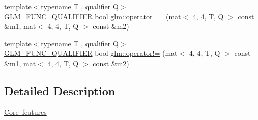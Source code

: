 \begin{DoxyCompactItemize}
\item 
{\footnotesize template$<$typename T , qualifier Q$>$ }\\\mbox{\hyperlink{setup_8hpp_a33fdea6f91c5f834105f7415e2a64407}{G\+L\+M\+\_\+\+F\+U\+N\+C\+\_\+\+Q\+U\+A\+L\+I\+F\+I\+ER}} bool \mbox{\hyperlink{namespaceglm_a8bcfe7feeeb780a7ea48046ae4c6cd57}{glm\+::operator==}} (mat$<$ 4, 4, T, Q $>$ const \&m1, mat$<$ 4, 4, T, Q $>$ const \&m2)
\item 
{\footnotesize template$<$typename T , qualifier Q$>$ }\\\mbox{\hyperlink{setup_8hpp_a33fdea6f91c5f834105f7415e2a64407}{G\+L\+M\+\_\+\+F\+U\+N\+C\+\_\+\+Q\+U\+A\+L\+I\+F\+I\+ER}} bool \mbox{\hyperlink{namespaceglm_ae03f4496a0725bb705dbfccd4daebae1}{glm\+::operator!=}} (mat$<$ 4, 4, T, Q $>$ const \&m1, mat$<$ 4, 4, T, Q $>$ const \&m2)
\end{DoxyCompactItemize}


\subsection{Detailed Description}
\mbox{\hyperlink{group__core}{Core features}} 
